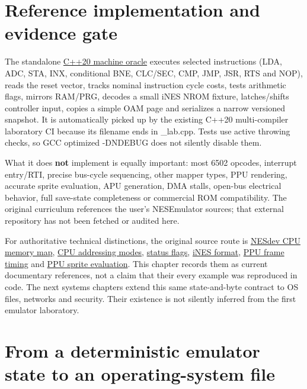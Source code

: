 \section{Reference implementation and evidence gate}\label{06-engine-ii-ch042-reference-implementation-and-evidence-gate}

The standalone \hyperref[source-file-552a9e2296dc984412c8f06d]{C++20 machine oracle} executes selected instructions (LDA, ADC, STA, INX, conditional BNE, CLC/SEC, CMP, JMP, JSR, RTS and NOP), reads the reset vector, tracks nominal instruction cycle costs, tests arithmetic flags, mirrors RAM/PRG, decodes a small iNES NROM fixture, latches/shifts controller input, copies a simple OAM page and serializes a narrow versioned snapshot. It is automatically picked up by the existing C++20 multi-compiler laboratory CI because its filename ends in \_lab.cpp. Tests use active throwing checks, so GCC optimized -DNDEBUG does not silently disable them.

What it does \textbf{not} implement is equally important: most 6502 opcodes, interrupt entry/RTI, precise bus-cycle sequencing, other mapper types, PPU rendering, accurate sprite evaluation, APU generation, DMA stalls, open-bus electrical behavior, full save-state completeness or commercial ROM compatibility. The original curriculum references the user's NESEmulator sources; that external repository has not been fetched or audited here.

For authoritative technical distinctions, the original source route is \href{https://www.nesdev.org/wiki/CPU_memory_map}{NESdev CPU memory map}, \href{https://www.nesdev.org/wiki/Addressing_modes}{CPU addressing modes}, \href{https://www.nesdev.org/wiki/Status_flag}{status flags}, \href{https://www.nesdev.org/wiki/INES}{iNES format}, \href{https://www.nesdev.org/wiki/PPU_frame_timing}{PPU frame timing} and \href{https://www.nesdev.org/wiki/PPU_sprite_evaluation}{PPU sprite evaluation}. This chapter records them as current documentary references, not a claim that their every example was reproduced in code. The next systems chapters extend this same state-and-byte contract to OS files, networks and security. Their existence is not silently inferred from the first emulator laboratory.

\section{From a deterministic emulator state to an operating-system file}\label{06-engine-ii-ch042-from-a-deterministic-emulator-state-to-an-operating-system-file}

